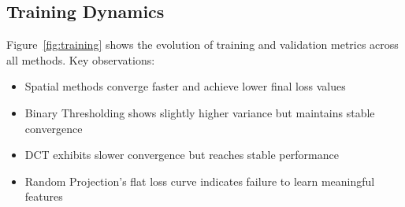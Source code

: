 \documentclass{article} %
\begin{document}
\subsection{Training Dynamics}
Figure~\ref{fig:training} shows the evolution of training and validation metrics across all methods. Key observations:

\begin{itemize}
    \item Spatial methods converge faster and achieve lower final loss values
    \item Binary Thresholding shows slightly higher variance but maintains stable convergence
    \item DCT exhibits slower convergence but reaches stable performance
    \item Random Projection's flat loss curve indicates failure to learn meaningful features
\end{itemize}
\end{document}
